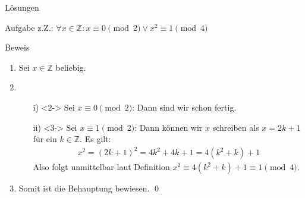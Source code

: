 {
	\begin{frame}[fragile]{Lösungen}
		\begin{alertblock}{Aufgabe}
			z.Z.: $\forall x \in \mathbb{Z}: x \equiv 0 \pmod{2} \vee x^2 \equiv 1 \pmod{4}$
		\end{alertblock}
		\begin{alertblock}{Beweis}
			\begin{enumerate}
				\item<1-> Sei $x \in \mathbb{Z}$ beliebig.
				\item<2->
					\begin{enumerate}
						\item[i)]<2-> Sei $x \equiv 0 \pmod{2}$: Dann sind wir schon fertig.
						\item[ii)]<3-> Sei $x \equiv 1 \pmod{2}$: Dann können wir $x$ schreiben als $x = 2k + 1$ für ein $k \in \mathbb{Z}$.
						Es gilt:
						\begin{align*}
						x^2 = (2k+1)^2 = 4k^2 + 4k + 1 = 4(k^2 + k) + 1
						\end{align*}  
						Also folgt unmittelbar laut Definition $x^2 \equiv 4(k^2 + k) + 1 \equiv 1 \pmod{4}$.
					\end{enumerate}
				\item<4-> Somit ist die Behauptung bewiesen. \qed
			\end{enumerate}
		\end{alertblock}
	\end{frame}
}